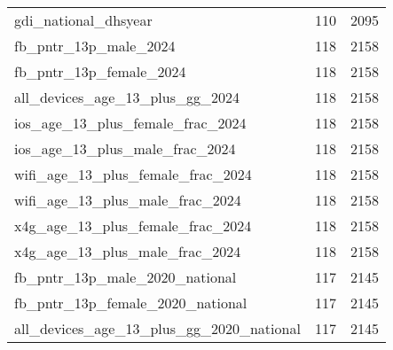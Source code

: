 \begin{table}[ht]
\begin{tabular}{lrr}
  gdi\_national\_dhsyear & 110 & 2095 \\ 
  fb\_pntr\_13p\_male\_2024 & 118 & 2158 \\ 
  fb\_pntr\_13p\_female\_2024 & 118 & 2158 \\ 
  all\_devices\_age\_13\_plus\_gg\_2024 & 118 & 2158 \\ 
  ios\_age\_13\_plus\_female\_frac\_2024 & 118 & 2158 \\ 
  ios\_age\_13\_plus\_male\_frac\_2024 & 118 & 2158 \\ 
  wifi\_age\_13\_plus\_female\_frac\_2024 & 118 & 2158 \\ 
  wifi\_age\_13\_plus\_male\_frac\_2024 & 118 & 2158 \\ 
  x4g\_age\_13\_plus\_female\_frac\_2024 & 118 & 2158 \\ 
  x4g\_age\_13\_plus\_male\_frac\_2024 & 118 & 2158 \\ 
  fb\_pntr\_13p\_male\_2020\_national & 117 & 2145 \\ 
  fb\_pntr\_13p\_female\_2020\_national & 117 & 2145 \\ 
  all\_devices\_age\_13\_plus\_gg\_2020\_national & 117 & 2145 \\ 
   \hline
\end{tabular}
\end{table}
